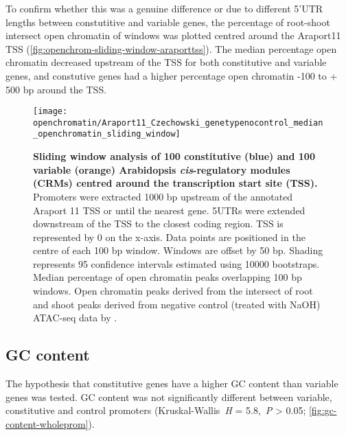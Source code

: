 \documentclass[../main.tex]{subfiles}
\begin{document}
To confirm whether this was a genuine difference or due to different 5'UTR lengths between constutitive and variable genes, the percentage of root\hyp{}shoot intersect open chromatin of windows was plotted centred around the Araport11 TSS (\autoref{fig:openchrom-sliding-window-araporttss}).
The median percentage open chromatin decreased upstream of the TSS for both constitutive and variable genes, and constutive genes had a higher percentage open chromatin -100 to + 500 bp around the TSS.%

\begin{figure}[!h]
	\begin{center}
		\capstart
		\texttt{[image: openchromatin/Araport11\_Czechowski\_genetypenocontrol\_median\_openchromatin\_sliding\_window]}
		\caption{
			\textbf{Sliding window analysis of 100 constitutive (blue) and 100 variable (orange) Arabidopsis \textit{cis}\hyp{}regulatory modules (CRMs) centred around the transcription start site (TSS).}
			Promoters were extracted 1000 bp upstream of the annotated Araport 11 \autocite{chengAraport11CompleteReannotation2017} TSS or until the nearest gene.
			5UTRs were extended downstream of the TSS to the closest coding region.
			TSS is represented by 0 on the x-axis.
			Data points are positioned in the centre of each 100 bp window.
			Windows are offset by 50 bp.
			Shading represents 95 confidence intervals estimated using 10000 bootstraps.
			Median percentage of open chromatin peaks overlapping 100 bp windows. Open chromatin peaks derived from the intersect of root and shoot peaks derived from negative control (treated with NaOH) ATAC\hyp{}seq data by \textcite{potterCytokininModulatesContextdependent2018}.		
			\label{fig:openchrom-sliding-window-araporttss}
		}
	\end{center}
\end{figure}


\subsection{GC content}

The hypothesis that constitutive genes have a higher GC content than variable genes was tested.
GC content was not significantly different between variable, constitutive and control promoters (Kruskal\hyp{}Wallis~\textit{H} = 5.8,~\textit{P} \textgreater{} 0.05; \autoref{fig:gc-content-wholeprom}).
\end{document}
